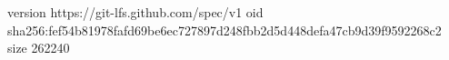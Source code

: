 version https://git-lfs.github.com/spec/v1
oid sha256:fef54b81978fafd69be6ec727897d248fbb2d5d448defa47cb9d39f9592268c2
size 262240
